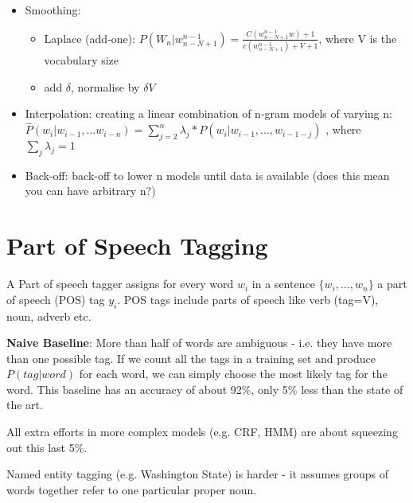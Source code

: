 \documentclass[]{article}
\begin{document}
\begin{itemize}
		\item Smoothing: 
		
			\begin{itemize}
				\item Laplace (add-one): $P(W_n | w_{n - N + 1}^{n-1}) = \frac{C( w_{n - N + 1}^{n-1}w) + 1}{c( w_{n - N + 1}^{n-1}) + V + 1}$, where V is the vocabulary size
				
				\item add $\delta$, normalise by $\delta V$
			
			\end{itemize}
		
	\item Interpolation: creating a linear combination of n-gram models of varying n: $\hat{P}(w_i | w_{i-1},...w_{i-n}) = \sum_{j=2}^{n} \lambda_j * P(w_i | w_{i-1},...,w_{i-1-j})$ , where $\sum_{j}\lambda_j = 1$ 
	
	\item Back-off: back-off to lower n models until data is available (does this mean you can have arbitrary n?)
	
	\end{itemize}
	
	
	
	\clearpage
	\section{Part of Speech Tagging}
	
	A Part of speech tagger assigns for every word $w_i$ in a sentence $\{w_i, ..., w_n\}$ a part of speech (POS) tag $y_i$. POS tags include parts of speech like verb (tag=V), noun, adverb etc.
	
	\textbf{Naive Baseline}: More than half of words are ambiguous - i.e. they have more than one possible tag. If we count all the tags in a training set and produce $P(tag | word)$ for each word, we can simply choose the most likely tag for the word. This baseline has an accuracy of about 92\%, only 5\% less than the state of the art. 
	
	All extra efforts in more complex models (e.g. CRF, HMM) are about squeezing out this last 5\%. 
	
	Named entity tagging (e.g. Washington State) is harder - it assumes groups of words together refer to one particular proper noun. 
	
\end{document}
